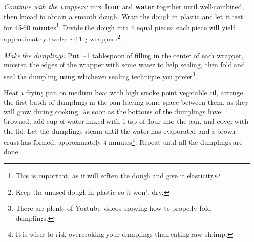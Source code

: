 \textit{Continue with the wrappers:} mix \textbf{flour} and \textbf{water} together until well-combined, then knead to obtain a smooth dough.
Wrap the dough in plastic and let it rest for 45-60 minutes\footnote{This is important, as it will soften the dough and give it elasticity.}.
Divide the dough into 4 equal pieces: each piece will yield approximately twelve $\sim$11 g wrappers\footnote{Keep the unused dough in plastic so it won't dry.}. 

\textit{Make the dumplings:} Put $\sim$1 tablespoon of filling in the center of each wrapper, moisten the edges of the wrapper with some water to help sealing,
then fold and seal the dumpling using whichever sealing technique you prefer\footnote{There are plenty of Youtube videos showing how to properly fold dumplings.}.

Heat a frying pan on medium heat with high smoke point vegetable oil, arrange the first batch of dumplings in the pan leaving some space between them, as they will grow during cooking.
As soon as the bottoms of the dumplings have browned, add  cup of water mixed with 1 tsp of flour into the pan, and cover with the lid. 
Let the dumplings steam until the water has evaporated and a brown crust has formed, approximately 4 minutes\footnote{It is wiser to risk overcooking your dumplings than eating raw shrimp.}. 
Repeat until all the dumplings are done.

\begin{recipeblock}
\end{recipeblock}